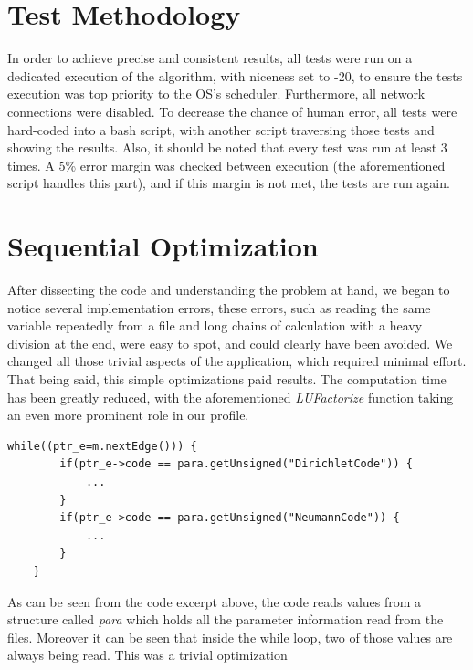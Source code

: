 \documentclass[a4paper,10pt,openright,openbib,twocolumn]{article}
\begin{document}
\section{Test Methodology} %
\label{sec:test_methodology}

In order to achieve precise and consistent results, all tests were run on a dedicated execution of the algorithm, with niceness set to -20, to ensure the tests execution was top priority to the OS's scheduler. Furthermore, all network connections were disabled. To decrease the chance of human error, all tests were hard-coded into a bash script, with another script traversing those tests and showing the results. Also, it should be noted that every test was run at least 3 times. A 5\% error margin was checked between execution (the aforementioned script handles this part), and if this margin is not met, the tests are run again. 


\section{Sequential Optimization}
\label{sec:sequentialopt}

After dissecting the code and understanding the problem at hand, we began to notice several implementation errors, these errors, such as reading the same variable repeatedly from a file and long chains of calculation with a heavy division at the end, were easy to spot, and could clearly have been avoided. We changed all those trivial aspects of the application, which required minimal effort. That being said, this simple optimizations paid results. The computation time has been greatly reduced, with the aforementioned \emph{LUFactorize} function taking an even more prominent role in our profile.

\begin{minipage}{.45\textwidth}
\lstset{
    language=C++,
    basicstyle=\ttfamily\small,
    breaklines=true
}
\begin{lstlisting}[caption=Excerpt from makeFlux]
    while((ptr_e=m.nextEdge())) {
        if(ptr_e->code == para.getUnsigned("DirichletCode")) {
            ...
        }
        if(ptr_e->code == para.getUnsigned("NeumannCode")) {
            ...
        }
    }
\end{lstlisting}
\end{minipage}

As can be seen from the code excerpt above, the code reads values from a structure called \emph{para} which holds all the parameter information read from the files. Moreover it can be seen that inside the while loop, two of those values are always being read. This was a trivial optimization
\end{document}

